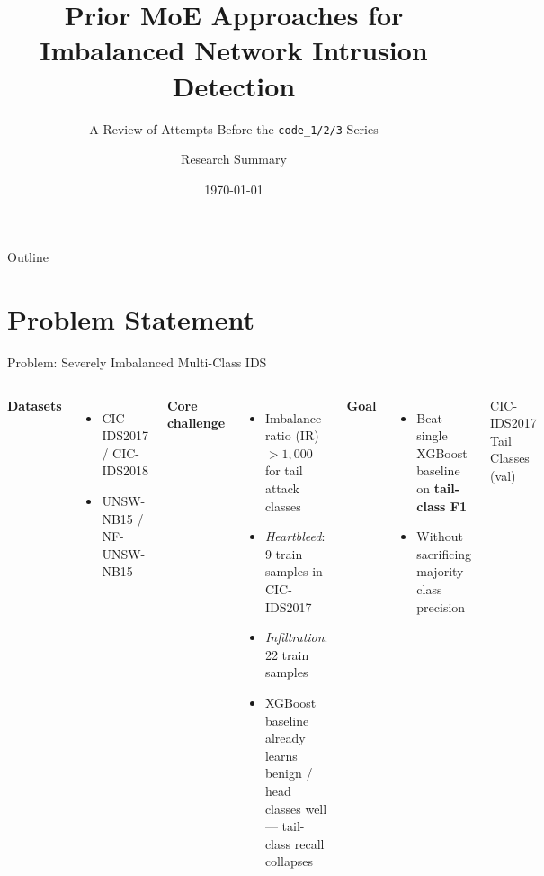 \documentclass[aspectratio=169,10pt]{beamer}
\title[Prior MoE Attempts for Imbalanced IDS]%
      {Prior MoE Approaches for\\Imbalanced Network Intrusion Detection}
\subtitle{A Review of Attempts Before the \texttt{code\_1/2/3} Series}
\author{Research Summary}
\institute{Network Security \& Class Imbalance Project}
\date{\today}
\begin{document}

\begin{frame}
  \titlepage
\end{frame}

\begin{frame}{Outline}
  \tableofcontents
\end{frame}

\section{Problem Statement}

\begin{frame}{Problem: Severely Imbalanced Multi-Class IDS}
  \begin{columns}[T]
      \textbf{Datasets}
      \begin{itemize}
        \item CIC-IDS2017 / CIC-IDS2018
        \item UNSW-NB15 / NF-UNSW-NB15
      \end{itemize}
      \vspace{6pt}
      \textbf{Core challenge}
      \begin{itemize}
        \item Imbalance ratio (IR) $> 1{,}000$ for tail attack classes
        \item \textit{Heartbleed}: 9 train samples in CIC-IDS2017
        \item \textit{Infiltration}: 22 train samples
        \item XGBoost baseline already learns benign / head classes well ---
              tail-class recall collapses
      \end{itemize}
      \vspace{6pt}
      \textbf{Goal}
      \begin{itemize}
        \item Beat single XGBoost baseline on \textbf{tail-class F1}
        \item Without sacrificing majority-class precision
      \end{itemize}
      \begin{block}{CIC-IDS2017 Tail Classes (val)}
        \footnotesize
        \begin{tabular}{lrr}

\end{tabular}
\end{block}
\end{columns}
\end{frame}
\end{document}
